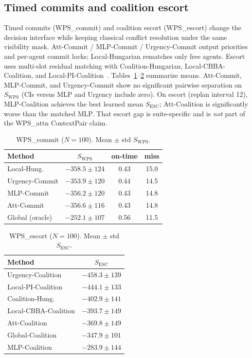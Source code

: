 \documentclass[journal,twocolumn,10pt]{IEEEtran}
\begin{document}
\subsection{Timed commits and coalition escort}
Timed commits (WPS\_commit) and coalition escort (WPS\_escort) change the decision interface while keeping classical conflict resolution under the same visibility mask.
Att-Commit / MLP-Commit / Urgency-Commit output priorities and per-agent commit locks; Local-Hungarian rematches only free agents.
Escort uses multi-slot residual matching with Coalition-Hungarian, Local-CBBA-Coalition, and Local-PI-Coalition~\cite{zhao2016pi}.
Tables~\ref{tab:commit}--\ref{tab:escort} summarize means.
Att-Commit, MLP-Commit, and Urgency-Commit show no significant pairwise separation on \(S_{\mathrm{WPS}}\) (CIs versus MLP and Urgency include zero).
On escort (replan interval 12), MLP-Coalition achieves the best learned mean \(S_{\mathrm{ESC}}\); Att-Coalition is significantly worse than the matched MLP.
That escort gap is suite-specific and is \emph{not} part of the WPS\_attn ContextPair claim.

\begin{table}[t]
\centering
\caption{WPS\_commit (\(N{=}100\)). Mean \(\pm\) std \(S_{\mathrm{WPS}}\).}
\label{tab:commit}
\setlength{\tabcolsep}{3pt}
\begin{tabular}{lccc}
\toprule
Method & \(S_{\mathrm{WPS}}\) & on-time & miss \\
\midrule
Local-Hung. & $-358.5\pm124$ & 0.43 & 15.0 \\
Urgency-Commit & $-353.9\pm120$ & 0.44 & 14.5 \\
MLP-Commit & $-356.2\pm120$ & 0.43 & 14.8 \\
Att-Commit & $-356.6\pm116$ & 0.43 & 14.8 \\
Global (oracle) & $-252.1\pm107$ & 0.56 & 11.5 \\
\bottomrule
\end{tabular}
\end{table}

\begin{table}[t]
\centering
\caption{WPS\_escort (\(N{=}100\)). Mean \(\pm\) std \(S_{\mathrm{ESC}}\).}
\label{tab:escort}
\setlength{\tabcolsep}{2.5pt}
\begin{tabular}{lc}
\toprule
Method & \(S_{\mathrm{ESC}}\) \\
\midrule
Urgency-Coalition & $-458.3\pm139$ \\
Local-PI-Coalition & $-444.1\pm133$ \\
Coalition-Hung. & $-402.9\pm141$ \\
Local-CBBA-Coalition & $-393.7\pm149$ \\
Att-Coalition & $-369.8\pm149$ \\
Global-Coalition & $-347.9\pm101$ \\
MLP-Coalition & $-283.9\pm144$ \\
\bottomrule
\end{tabular}
\end{table}
\end{document}

